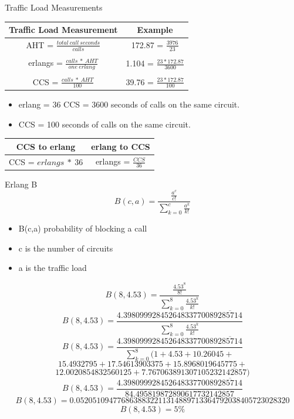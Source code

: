 \documentclass[landscape,fontscale=1,margin=0.2cm,paperwidth=70truecm, paperheight=40truecm,debug]{baposter}
\begin{document}
\begin{poster}
\begin{posterbox}[column=0,below=auto,height=bottom]{Traffic Load Measurements}
\begin{center}
\begin{tabular}{|c|c|}
\hline
Traffic Load Measurement & Example\\\hline

AHT = $\frac{total~call~seconds}{calls}$ & 172.87 = $\frac{3976}{23}$\\
&\\
erlangs = $\frac{calls~*~AHT}{one~erlang}$ & 1.104 = $\frac{23 * 172.87}{3600}$\\
&\\
CCS = $\frac{calls~*~AHT}{100}$ & 39.76 = $\frac{23 * 172.87}{100}$\\\hline
\end{tabular}
\end{center}
\begin{itemize}
\item erlang = 36 CCS = 3600 seconds of calls on the same circuit.
\item CCS = 100 seconds of calls on the same circuit.
\end{itemize}
\begin{center}
\begin{tabular}{|c|c|}
\hline
CCS to erlang&erlang to CCS\\\hline
CCS = $erlangs~ *~36$ & erlangs = $\frac{CCS}{36}$\\\hline
\end{tabular}
\end{center}
\end{posterbox}
\begin{posterbox}[column=1]{Erlang B}
\[
B(c,a) = \frac{\frac{a^c}{c!}}{\sum\limits_{k=0}^{c} \frac{a^k}{k!}}
\]
\begin{itemize}
\item B(c,a) probability of blocking a call
\item c is the number of circuits
\item a is the traffic load
\end{itemize}
\[
B(8,4.53) = \frac{\frac{4.53^8}{8!}}{\sum\limits_{k=0}^{8}\frac{4.53^k}{k!}}
\]
\[
B(8,4.53) = \frac{4.39809992845264833770089\overline{285714}}{\sum\limits_{k=0}^{8}\frac{4.53^k}{k!}}
\]
\[
B(8,4.53) = \frac{4.39809992845264833770089\overline{285714}}{\sum\limits_{k=0}^{8} (1 + 4.53 + 10.26045 +}
\]
\[
15.4932795 + 17.54613903375 + 15.8968019645775 +
\]
\[
 12.0020854832560125 + 7.767063891307105232\overline{142857})
\]
\[
\]
\[
B(8,4.53) = \frac{4.39809992845264833770089\overline{285714}}{84.495819872890617732142857}
\]
\[
B(8,4.53) = 0.0520510947768638832211314889713364792038405723028320
\]
\[
B(8,4.53) = 5\%
\]


\end{posterbox}
\end{poster}
\end{document}
